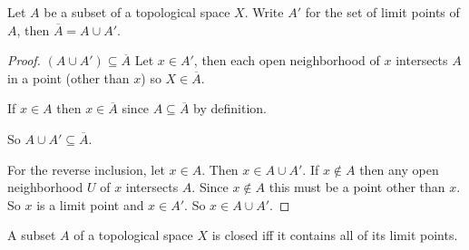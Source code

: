 \documentclass[12pt, twosided]{article}
\begin{document}
  \begin{thm}
    Let \(A\) be a subset of a topological space \(X\). Write \(A\prime\) for the set of limit points of \(A\), then \(\overline{A} = A \cup A\prime\).
  \end{thm}

  \begin{proof}

    \((A \cup A\prime) \subseteq \overline{A}\) Let \(x \in A\prime\), then each open neighborhood of \(x\) intersects \(A\) in a point (other than \(x\)) so \(X \in \overline{A}\).

    If \(x \in A\) then \(x \in \overline{A}\) since \(A \subseteq \overline{A}\) by definition.
    
    So \(A \cup A\prime \subseteq \overline{A}\).

    For the reverse inclusion, let \(x \in A\). Then \(x \in A \cup A\prime\). If \(x \not\in A\) then any open neighborhood \(U\) of \(x\) intersects \(A\). Since \(x \not\in A\) this must be a point other than \(x\). So \(x\) is a limit point and \(x \in A\prime\). So \(x \in A \cup A\prime\). 
  \end{proof}

  \begin{cor}
    A subset \(A\) of a topological space \(X\) is closed iff it contains all of its limit points.
  \end{cor}
\end{document}
